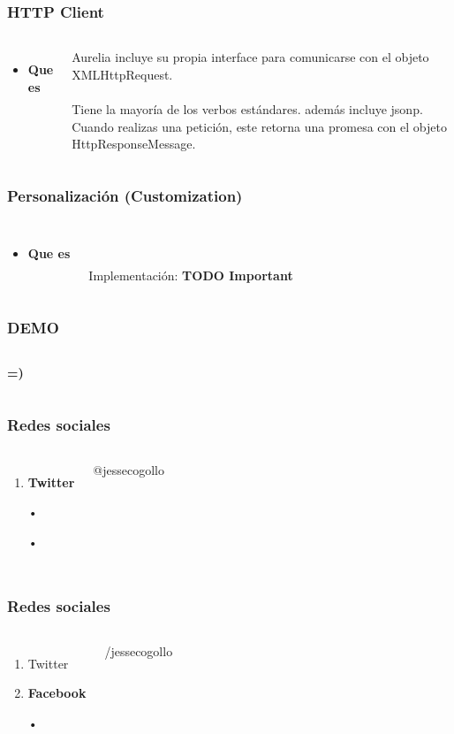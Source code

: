\documentclass{beamer}
\begin{document}
\begin{frame}
\frametitle{HTTP Client}
\begin{columns}[c]
\begin{itemize}
\item \textbf{Que es}
\end{itemize}
Aurelia incluye su propia interface para comunicarse con el objeto XMLHttpRequest.
\\~\\
Tiene la mayor\'ia de los verbos est\'andares. adem\'as incluye jsonp.
Cuando realizas una petici\'on, este retorna una promesa con el objeto HttpResponseMessage.
\end{columns}
\end{frame}
\begin{frame}
\frametitle{Personalizaci\'on (Customization)}
\begin{columns}[c]
\begin{itemize}
\item \textbf{Que es}
\end{itemize}
\\~\\
Implementaci\'on: \textbf{TODO Important}
\end{columns}
\end{frame}
\begin{frame}
\frametitle{DEMO}
\begin{columns}[c]
\textbf{=)}
\end{columns}
\end{frame}
\begin{frame}
\frametitle{Redes sociales}
\begin{columns}[c]
\begin{enumerate}
\item \textbf{Twitter}
\item[•]
\item[•]
\end{enumerate}
{\color{blue}@jessecogollo}
\end{columns}
\end{frame}
\begin{frame}
\frametitle{Redes sociales}
\begin{columns}[c]
\begin{enumerate}
\item Twitter
\item \textbf{Facebook}
\item[•]
\end{enumerate}
{\color{blue}/jessecogollo}
\end{columns}
\end{frame}
\end{document}
